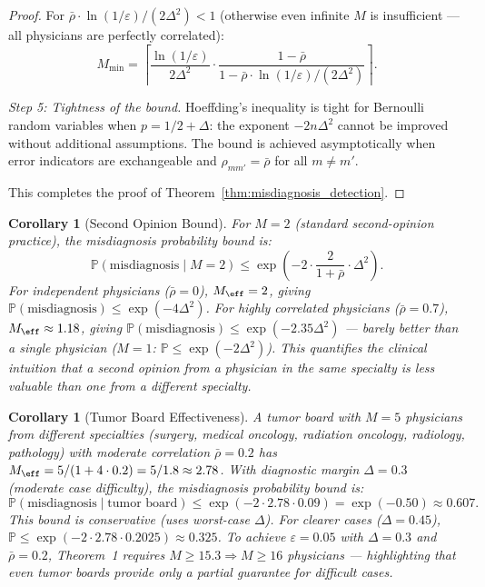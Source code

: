 \documentclass[11pt,a4paper]{article}
\newtheorem{corollary}[theorem]{Corollary}
\theoremstyle{definition}
\newcommand{\Pbb}{\mathbb{P}}
\begin{document}
\begin{proof}
For $\bar{\rho} \cdot \ln(1/\varepsilon)/(2\Delta^2) < 1$ (otherwise even
infinite $M$ is insufficient --- all physicians are perfectly correlated):
\begin{equation}
    M_{\min} = \left\lceil \frac{\ln(1/\varepsilon)}{2\Delta^2} \cdot \frac{1 - \bar{\rho}}{1 - \bar{\rho} \cdot \ln(1/\varepsilon)/(2\Delta^2)} \right\rceil.
\end{equation}

\medskip\noindent\textit{Step 5: Tightness of the bound.}
Hoeffding's inequality is tight for Bernoulli random variables when
$p = 1/2 + \Delta$: the exponent $-2n\Delta^2$ cannot be improved without
additional assumptions. The bound is achieved asymptotically when error
indicators are exchangeable and $\rho_{mm'} = \bar{\rho}$ for all $m \neq m'$.

This completes the proof of Theorem~\ref{thm:misdiagnosis_detection}.
\end{proof}

\begin{corollary}[Second Opinion Bound]
\label{cor:second_opinion}
For $M=2$ (standard second-opinion practice), the misdiagnosis probability
bound is:
\begin{equation}\label{eq:second_opinion_bound}
    \Pbb(\text{misdiagnosis} \mid M=2) \le \exp\!\left(-2 \cdot \frac{2}{1+\bar{\rho}} \cdot \Delta^2\right).
\end{equation}
For independent physicians ($\bar{\rho} = 0$), $M_{\eff} = 2$, giving
$\Pbb(\text{misdiagnosis}) \le \exp(-4\Delta^2)$.
For highly correlated physicians ($\bar{\rho} = 0.7$), $M_{\eff} \approx 1.18$,
giving $\Pbb(\text{misdiagnosis}) \le \exp(-2.35\Delta^2)$ --- barely better
than a single physician ($M=1$: $\Pbb \le \exp(-2\Delta^2)$).
This quantifies the clinical intuition that a second opinion from a physician
in the same specialty is less valuable than one from a different specialty.
\end{corollary}

\begin{corollary}[Tumor Board Effectiveness]
\label{cor:tumor_board}
A tumor board with $M = 5$ physicians from different specialties
(surgery, medical oncology, radiation oncology, radiology, pathology)
with moderate correlation $\bar{\rho} = 0.2$ has $M_{\eff} = 5/(1 + 4 \cdot 0.2)
= 5/1.8 \approx 2.78$. With diagnostic margin $\Delta = 0.3$ (moderate case
difficulty), the misdiagnosis probability bound is:
\begin{equation}
    \Pbb(\text{misdiagnosis} \mid \text{tumor board}) \le \exp(-2 \cdot 2.78 \cdot 0.09) = \exp(-0.50) \approx 0.607.
\end{equation}
This bound is conservative (uses worst-case $\Delta$). For clearer cases
($\Delta = 0.45$), $\Pbb \le \exp(-2 \cdot 2.78 \cdot 0.2025) \approx 0.325$.
To achieve $\varepsilon = 0.05$ with $\Delta = 0.3$ and $\bar{\rho} = 0.2$,
Theorem~1 requires $M \ge 15.3 \Rightarrow M \ge 16$ physicians --- highlighting
that even tumor boards provide only a partial guarantee for difficult cases.
\end{corollary}
\end{document}
